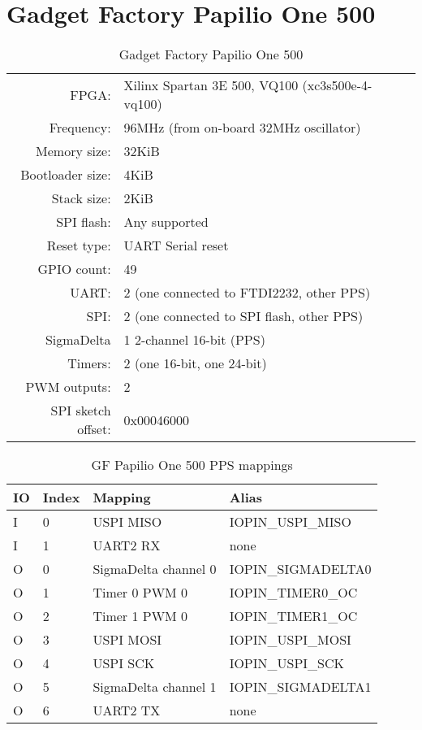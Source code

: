 \section{Gadget Factory Papilio One 500}

\begin{table}[H]
\begin{center}
\begin{tabularx}{14cm}{rX}
FPGA: & Xilinx Spartan 3E 500, VQ100 (xc3s500e-4-vq100)\\
Frequency: & 96MHz (from on-board 32MHz oscillator)\\
Memory size: & 32KiB \\
Bootloader size: & 4KiB \\
Stack size: & 2KiB \\
SPI flash: & Any supported \\
Reset type: & UART Serial reset \\
GPIO count: &  49 \\
UART: & 2 (one connected to FTDI2232, other PPS) \\
SPI: & 2 (one connected to SPI flash, other PPS) \\
SigmaDelta & 1 2-channel 16-bit (PPS) \\
Timers: & 2 (one 16-bit, one 24-bit) \\
PWM outputs: & 2     \\
SPI sketch offset: & 0x00046000
\end{tabularx}
\caption{Gadget Factory Papilio One 500}
\end{center}
\end{table}

\begin{table}[H]
\begin{center}
\begin{tabularx}{14cm}{lllX}

IO & Index & Mapping & Alias \\
\hline
I & 0 & USPI MISO & IOPIN\_USPI\_MISO \\
I & 1 & UART2 RX & none \\
O & 0 & SigmaDelta channel 0 & IOPIN\_SIGMADELTA0 \\
O & 1 & Timer 0 PWM 0 &  IOPIN\_TIMER0\_OC \\
O & 2 & Timer 1 PWM 0 & IOPIN\_TIMER1\_OC \\
O & 3 & USPI MOSI & IOPIN\_USPI\_MOSI \\
O & 4 & USPI SCK & IOPIN\_USPI\_SCK \\
O & 5 & SigmaDelta channel 1 & IOPIN\_SIGMADELTA1 \\
O & 6 & UART2 TX & none \\
\end{tabularx}
\caption{GF Papilio One 500 PPS mappings}
\end{center}
\end{table}



